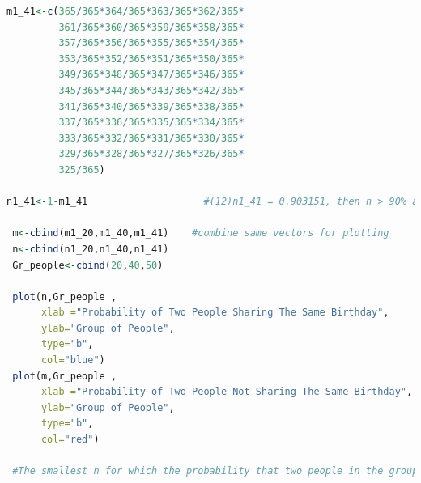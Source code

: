 \documentclass[12pt,letterpaper]{article}
\begin{document}
\begin{enumerate}[label=\Alph*]
\begin{lstlisting}[language=R]
m1_41<-c(365/365*364/365*363/365*362/365*     
         361/365*360/365*359/365*358/365*    
         357/365*356/365*355/365*354/365*
         353/365*352/365*351/365*350/365*
         349/365*348/365*347/365*346/365*
         345/365*344/365*343/365*342/365*    
         341/365*340/365*339/365*338/365*
         337/365*336/365*335/365*334/365*
         333/365*332/365*331/365*330/365*
         329/365*328/365*327/365*326/365*
         325/365)  

n1_41<-1-m1_41              	  #(12)n1_41 = 0.903151, then n > 90% about 0.003151

 m<-cbind(m1_20,m1_40,m1_41)    #combine same vectors for plotting
 n<-cbind(n1_20,n1_40,n1_41)
 Gr_people<-cbind(20,40,50)
 
 plot(n,Gr_people ,
      xlab ="Probability of Two People Sharing The Same Birthday",
      ylab="Group of People",
      type="b",
      col="blue")
 plot(m,Gr_people ,
      xlab ="Probability of Two People Not Sharing The Same Birthday",
      ylab="Group of People",
      type="b",
      col="red")
 
 #The smallest n for which the probability that two people in the group share a birthday is greater than 90% is 41, since n41>90%  about 0.003151.
	\end{lstlisting}
	

\end{enumerate}
\end{document}
